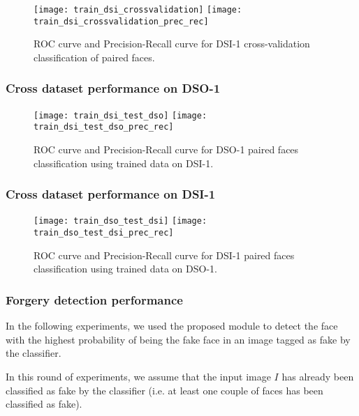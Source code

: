 \begin{figure}[!htb]
  \texttt{[image: train\_dsi\_crossvalidation]}
\endminipage\hfill
{}
  \texttt{[image: train\_dsi\_crossvalidation\_prec\_rec]}
\endminipage
\caption{ROC curve and Precision-Recall curve for DSI-1 cross-validation classification of paired faces.}\label{fig:regiondetnormal}
\end{figure}

\subsubsection{Cross dataset performance on DSO-1}

\begin{figure}[!htb]
  \texttt{[image: train\_dsi\_test\_dso]}
\endminipage\hfill
{}
  \texttt{[image: train\_dsi\_test\_dso\_prec\_rec]}
\endminipage
\caption{ROC curve and Precision-Recall curve for DSO-1 paired faces classification using trained data on DSI-1.}\label{fig:regiondetnormal}
\end{figure}

\subsubsection{Cross dataset performance on DSI-1}

\begin{figure}[!htb]
  \texttt{[image: train\_dso\_test\_dsi]}
\endminipage\hfill
{}
  \texttt{[image: train\_dso\_test\_dsi\_prec\_rec]}
\endminipage
\caption{ROC curve and Precision-Recall curve for DSI-1 paired faces classification using trained data on DSO-1.}\label{fig:regiondetnormal}
\end{figure}


\subsubsection{Forgery detection performance}

In the following experiments, we used the proposed module to detect the face with the highest probability of being the fake face in an image tagged as fake by the classifier. 

In this round of experiments, we assume that the input image $I$ has already been classified as fake by the classifier (i.e. at least one couple of faces has been classified as fake). 

